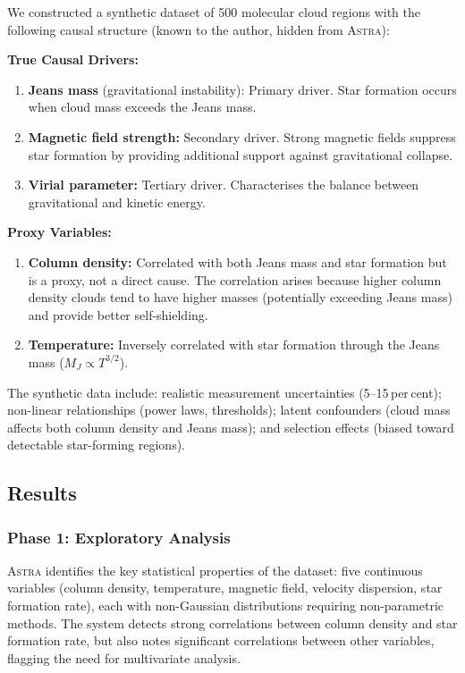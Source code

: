 \documentclass[usenatbib]{rasti}
\newcommand{\astra}{\textsc{Astra}\xspace}
\begin{document}
We constructed a synthetic dataset of 500 molecular cloud regions with the following causal structure (known to the author, hidden from \astra):

\textbf{True Causal Drivers:}
\begin{enumerate}
  \item[(i)] \textbf{Jeans mass} (gravitational instability): Primary driver. Star formation occurs when cloud mass exceeds the Jeans mass.
  \item[(ii)] \textbf{Magnetic field strength:} Secondary driver. Strong magnetic fields suppress star formation by providing additional support against gravitational collapse.
  \item[(iii)] \textbf{Virial parameter:} Tertiary driver. Characterises the balance between gravitational and kinetic energy.
\end{enumerate}

\textbf{Proxy Variables:}
\begin{enumerate}
  \item[(i)] \textbf{Column density:} Correlated with both Jeans mass and star formation but is a proxy, not a direct cause. The correlation arises because higher column density clouds tend to have higher masses (potentially exceeding Jeans mass) and provide better self-shielding.
  \item[(ii)] \textbf{Temperature:} Inversely correlated with star formation through the Jeans mass ($M_J \propto T^{3/2}$).
\end{enumerate}

The synthetic data include: realistic measurement uncertainties (5--15\,per\,cent); non-linear relationships (power laws, thresholds); latent confounders (cloud mass affects both column density and Jeans mass); and selection effects (biased toward detectable star-forming regions).

\subsection{Results}
\label{sec:tc6:results}

\subsubsection{Phase 1: Exploratory Analysis}
\label{sec:tc6:phase1}

\astra identifies the key statistical properties of the dataset: five continuous variables (column density, temperature, magnetic field, velocity dispersion, star formation rate), each with non-Gaussian distributions requiring non-parametric methods.
The system detects strong correlations between column density and star formation rate, but also notes significant correlations between other variables, flagging the need for multivariate analysis.
\end{document}
